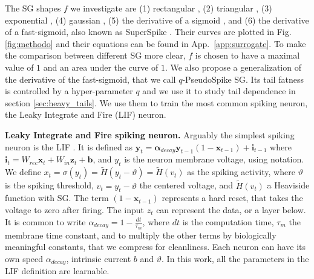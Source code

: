 The SG shapes $f$ we investigate are (1) rectangular \cite{hubara2016binarized}, (2) triangular \cite{esser2016convolutional, lsnn}, (3) exponential \cite{Shrestha2018SLAYERSL}, (4) gaussian \cite{taulsnn}, (5) the derivative of a sigmoid \cite{zenke2021remarkable}, and (6) the derivative of a fast-sigmoid, also known as SuperSpike \cite{zenke2018superspike}. Their curves are plotted in Fig. \ref{fig:methodo} and their equations can be found in App.~\ref{app:surrogate}. To make the comparison between different SG more clear, $f$ is chosen to have a maximal value of $1$ and an area under the curve of $1$. We also propose a generalization of the derivative of the fast-sigmoid, that we call $q$-PseudoSpike SG. Its tail fatness is controlled by a hyper-parameter $q$ and we use it to study tail dependence in section \ref{sec:heavy_tails}. 
We use them to train the most common spiking neuron, the Leaky Integrate and Fire (LIF) neuron.

\noindent\textbf{Leaky Integrate and Fire spiking neuron.}
Arguably the simplest spiking neuron is the LIF \cite{lapique1907recherches, gerstner2014neuronal, wozniak2020deep}. It is defined as $\boldsymbol{y}_t = \boldsymbol{\alpha}_{decay} \boldsymbol{y}_{t-1}(1-\boldsymbol{x}_{t-1}) + \boldsymbol{i}_{t-1} $ where $\boldsymbol{i}_{t}=W_{rec}\boldsymbol{x}_{t} + W_{in}\boldsymbol{z}_t + \boldsymbol{b}$, and $y_t$ is the neuron membrane voltage, using \cite{glorot2010understanding, he2015delving} notation. We define $x_{t} = \sigma(y_{t})= \tilde{H}(y_{t}-\vartheta)= \tilde{H}(v_{t})$ as the spiking activity, where  $\vartheta$ is the spiking threshold, $v_t=y_{t}-\vartheta$ the centered voltage, and $\tilde{H}(v_{t})$ a Heaviside function with SG. The term $(1-\boldsymbol{x}_{t-1})$ represents a hard reset, that takes the voltage to zero after firing. The input $z_t$ can represent the data, or a layer below. It is common to write $\alpha_{decay}= 1-\frac{dt}{\tau_m}$, where $dt$ is the computation time, $\tau_m$ the membrane time constant, and to multiply the other terms by biologically meaningful constants, that we compress for cleanliness. Each neuron can have its own speed $\alpha_{decay}$, intrinsic current $b$ and $\vartheta$. In this work, all the parameters in the LIF definition are learnable.

